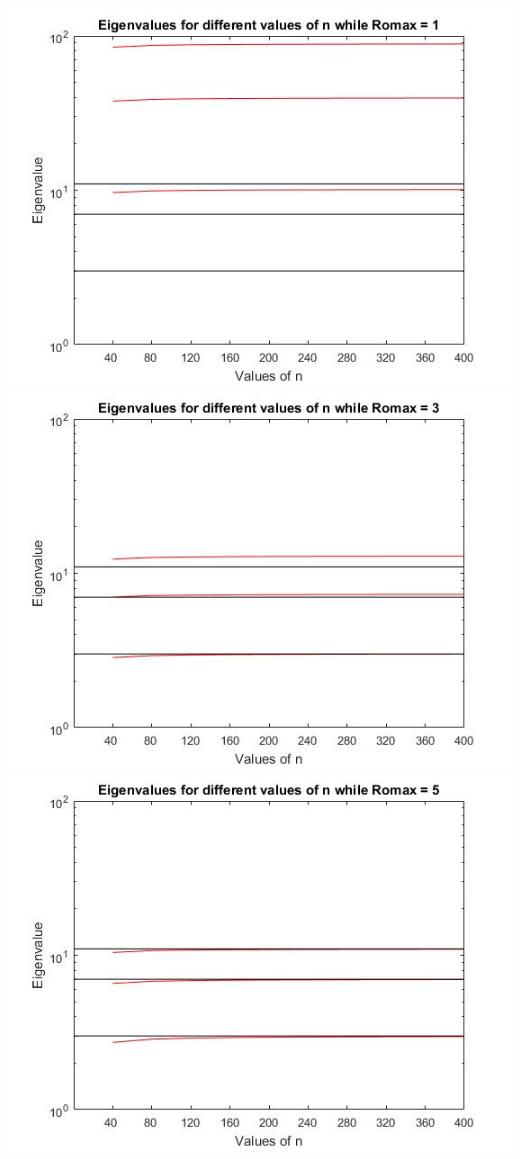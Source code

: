 \documentclass[10pt,a4paper]{article}
\begin{document}
\begin{center}
\includegraphics[scale=0.65]{rho1.jpg}
\includegraphics[scale=0.65]{rho3.jpg}
\includegraphics[scale=0.65]{rho5.jpg}

\end{center}
\end{document}
